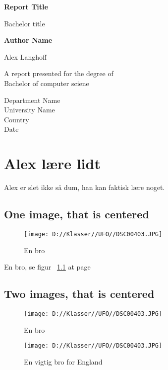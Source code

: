 \documentclass{report}
\begin{document}
\begin{titlepage}
\begin{center}
\vspace*{1cm}

\textbf{Report Title}

\vspace{0.5cm}
 Bachelor title
            
\vspace{1.5cm}

\textbf{Author Name}

\vspace{1.5cm}
Alex Langhoff

	
       \vfill
            
A report presented for the degree of\\
Bachelor of computer sciene
            
       \vspace{0.8cm}
     
      
            
       Department Name\\
       University Name\\
       Country\\
       Date
            
   \end{center}
\end{titlepage}


\tableofcontents



\chapter{Alex lære lidt}
Alex er slet ikke så dum, han kan faktisk lære noget.

\section{One image, that is centered}
\lipsum[5]
\begin{figure}[h]
\centering
\texttt{[image: D://Klasser//UFO//DSC00403.JPG]}
\caption{En bro}\label{mylabel}
\end{figure}
\lipsum[3]
  
En bro, se figur ~\ref{mylabel} at page~\pageref{mylabel}



\section{Two images, that is centered}
\lipsum[5]
\begin{figure}[h]
\centering
\begin{minipage}{0.45\textwidth}
\centering
\texttt{[image: D://Klasser//UFO//DSC00403.JPG]}
\caption{En bro}
\end{minipage}\hfill
\begin{minipage}{0.45\textwidth}
\centering
\caption{En vigtig bro for England}
\texttt{[image: D://Klasser//UFO//DSC00403.JPG]}
\end{minipage}
\end{figure}
\lipsum[3]
\end{document}
